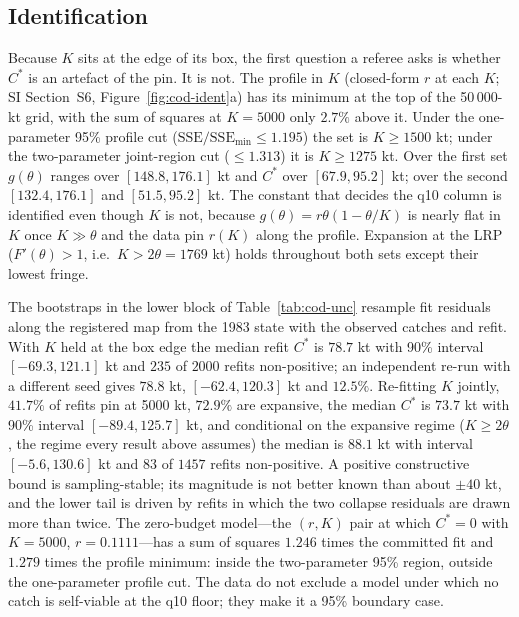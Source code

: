 \documentclass[11pt,a4paper]{article}
\theoremstyle{plain}
\theoremstyle{definition}
\theoremstyle{remark}
\newcommand{\LRP}{\theta}
\newcommand{\Cstar}{C^{*}}
\begin{document}
\subsection{Identification}\label{sec:cod-ident}

Because $K$ sits at the edge of its box, the first question a referee asks is whether $\Cstar$ is an artefact of the pin. It is not. The profile in $K$ (closed-form $r$ at each $K$; SI Section~S6, Figure~\ref{fig:cod-ident}a) has its minimum at the top of the 50\,000-kt grid, with the sum of squares at $K=5000$ only $2.7\%$ above it. Under the one-parameter 95\% profile cut ($\mathrm{SSE}/\mathrm{SSE}_{\min}\le1.195$) the set is $K\ge1500$ kt; under the two-parameter joint-region cut ($\le1.313$) it is $K\ge1275$ kt. Over the first set $g(\LRP)$ ranges over $[148.8,176.1]$ kt and $\Cstar$ over $[67.9,95.2]$ kt; over the second $[132.4,176.1]$ and $[51.5,95.2]$ kt. The constant that decides the q10 column is identified even though $K$ is not, because $g(\LRP)=r\LRP(1-\LRP/K)$ is nearly flat in $K$ once $K\gg\LRP$ and the data pin $r(K)$ along the profile. Expansion at the LRP ($F'(\LRP)>1$, i.e.\ $K>2\LRP=1769$ kt) holds throughout both sets except their lowest fringe.

The bootstraps in the lower block of Table~\ref{tab:cod-unc} resample fit residuals along the registered map from the 1983 state with the observed catches and refit. With $K$ held at the box edge the median refit $\Cstar$ is $78.7$ kt with 90\% interval $[-69.3,121.1]$ kt and $235$ of $2000$ refits non-positive; an independent re-run with a different seed gives $78.8$ kt, $[-62.4,120.3]$ kt and $12.5\%$. Re-fitting $K$ jointly, $41.7\%$ of refits pin at 5000 kt, $72.9\%$ are expansive, the median $\Cstar$ is $73.7$ kt with 90\% interval $[-89.4,125.7]$ kt, and conditional on the expansive regime ($K\ge2\LRP$, the regime every result above assumes) the median is $88.1$ kt with interval $[-5.6,130.6]$ kt and $83$ of $1457$ refits non-positive. A positive constructive bound is sampling-stable; its magnitude is not better known than about $\pm40$ kt, and the lower tail is driven by refits in which the two collapse residuals are drawn more than twice. The zero-budget model---the $(r,K)$ pair at which $\Cstar=0$ with $K=5000$, $r=0.1111$---has a sum of squares $1.246$ times the committed fit and $1.279$ times the profile minimum: inside the two-parameter 95\% region, outside the one-parameter profile cut. The data do not exclude a model under which no catch is self-viable at the q10 floor; they make it a 95\% boundary case.
\end{document}
